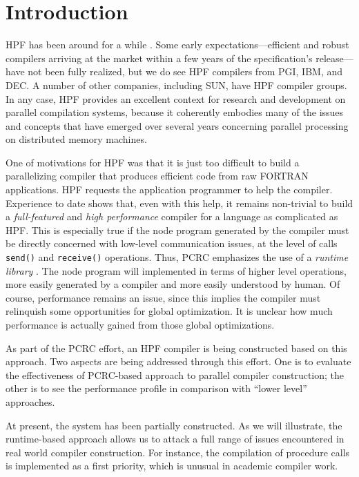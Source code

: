 \newpage

\section{Introduction}

HPF has been around for a while \cite{hpf:1}.  Some early
expectations---efficient and robust compilers arriving at the market
within a few years of the specification's release---have not been fully
realized, but we do see HPF compilers from PGI, IBM, and DEC.
A number of other companies, including SUN, have HPF compiler
groups.  In any case, HPF provides an excellent context for research
and development on parallel compilation systems, because it coherently
embodies many of the issues and concepts that have emerged over several
years concerning parallel processing on distributed memory machines.

One of motivations for HPF was that it is just too difficult
to build a parallelizing compiler that produces efficient code
from raw FORTRAN applications. HPF requests
the application programmer to help the compiler.
Experience to date shows that, even with this help, it remains non-trivial
to build a {\em full-featured} and {\em high performance} 
compiler for a language as complicated as HPF.
This is especially true if the node program generated
by the compiler must be directly concerned with low-level communication
issues, at the level of calls {\tt send()} and {\tt receive()}
operations.  Thus, PCRC emphasizes the use of a {\em runtime library}
\cite{pcrc:1}.  The node program will implemented in terms of higher
level operations, more easily generated by a compiler and more easily
understood by human.  Of course, performance remains an issue, since
this implies the compiler must relinquish some opportunities for global
optimization.  It is unclear how much performance is actually
gained from those global optimizations.

As part of the PCRC effort, an HPF compiler is being constructed
based on this approach.  Two aspects are being addressed through this
effort.  One is to evaluate the effectiveness of PCRC-based approach to
parallel compiler construction; the other is to see the performance
profile in comparison with ``lower level'' approaches.

At present, the system has been partially constructed.  As we will
illustrate, the runtime-based approach allows us to attack a full range of
issues encountered in real world compiler construction.  For instance,
the compilation of procedure calls is implemented as a first priority,
which is unusual in academic compiler work.


